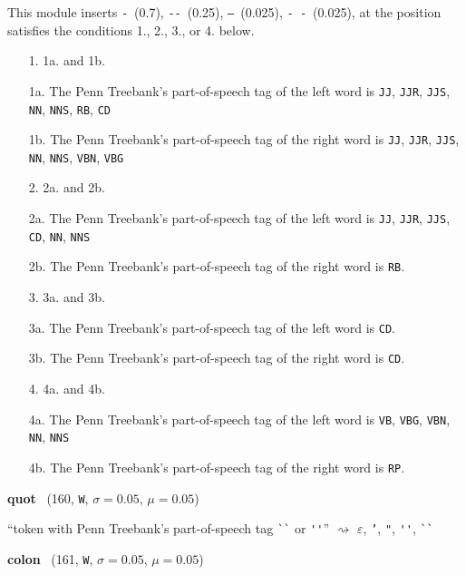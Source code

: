 \documentclass[11pt]{article}
\newenvironment{desc}{%
	\list{}{%
		\parsep 0.25em
		\topsep 0.25em
		\leftmargin 1em
		\rightmargin 0em
	}
	\item\relax
	\sloppy
}{%
	\endlist
}
\newcommand{\attr}[4]{%
	(#1, \texttt{#2}, $\sigma=#3$, $\mu=#4$)
}
\begin{document}
\begin{desc}
	This module inserts
	\texttt{-}~(0.7),
	\texttt{-{}-}~(0.25),
	\texttt{---}~(0.025),
	\texttt{-~-}~(0.025),
	at the position satisfies the conditions 1., 2., 3., or 4. below.

	\begin{itemize}
		\setlength{\itemsep}{0em}
		\setlength{\parskip}{0em}
		\item[1.] 1a. and 1b.
		\item[1a.] The Penn Treebank's part-of-speech tag of the left word is
			\texttt{JJ},
			\texttt{JJR},
			\texttt{JJS},
			\texttt{NN},
			\texttt{NNS},
			\texttt{RB},
			\texttt{CD}
		\item[1b.] The Penn Treebank's part-of-speech tag of the right word is
			\texttt{JJ},
			\texttt{JJR},
			\texttt{JJS},
			\texttt{NN},
			\texttt{NNS},
			\texttt{VBN},
			\texttt{VBG}
		\item[2.] 2a. and 2b.
		\item[2a.] The Penn Treebank's part-of-speech tag of the left word is
			\texttt{JJ},
			\texttt{JJR},
			\texttt{JJS},
			\texttt{CD},
			\texttt{NN},
			\texttt{NNS}
		\item[2b.] The Penn Treebank's part-of-speech tag of the right word is \texttt{RB}.
		\item[3.] 3a. and 3b.
		\item[3a.] The Penn Treebank's part-of-speech tag of the left word is \texttt{CD}.
		\item[3b.] The Penn Treebank's part-of-speech tag of the right word is \texttt{CD}.
		\item[4.] 4a. and 4b.
		\item[4a.] The Penn Treebank's part-of-speech tag of the left word is
			\texttt{VB},
			\texttt{VBG},
			\texttt{VBN},
			\texttt{NN},
			\texttt{NNS}
		\item[4b.] The Penn Treebank's part-of-speech tag of the right word is \texttt{RP}.
	\end{itemize}
\end{desc}

\noindent
\textbf{quot}~\attr{160}{W}{0.05}{0.05}

\begin{desc}
	``token with Penn Treebank's part-of-speech tag \verb|``| or \verb|''|''
	$\rightsquigarrow$
	\textit{$\varepsilon$},
	\texttt{'},
	\texttt{"},
	\verb|''|,
	\verb|``|
\end{desc}

\noindent
\textbf{colon}~\attr{161}{W}{0.05}{0.05}
\end{document}
